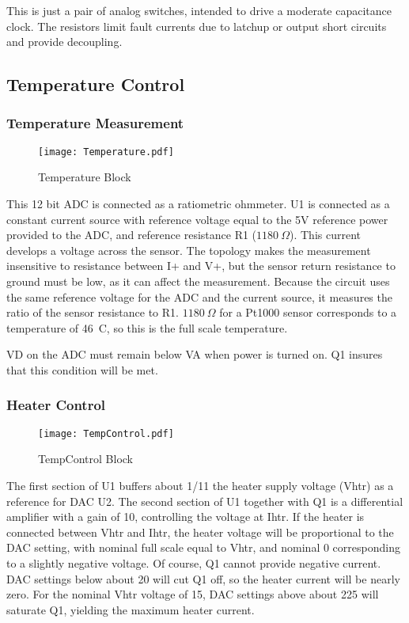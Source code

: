 This is just a pair of analog switches, intended to drive a moderate capacitance clock. The resistors limit fault currents due to latchup or output short circuits and provide decoupling.

\subsection{Temperature Control}

\subsubsection{Temperature Measurement}
   \begin{figure}
   \begin{center}
   \texttt{[image: Temperature.pdf]}
   \end{center}
   \caption{Temperature Block}
   \end{figure}
   
This 12 bit ADC is connected as a ratiometric ohmmeter. U1 is connected as a constant current source with reference voltage equal to the 5V reference power provided to the ADC, and reference resistance R1 ($1180\ \Omega$). This current develops a voltage across the sensor. The topology makes the measurement insensitive to resistance between I+ and V+, but the sensor return resistance to ground must be low, as it can affect the measurement. Because the circuit uses the same reference voltage for the ADC and the current source, it measures the ratio of the sensor resistance to R1. $1180\ \Omega$ for a Pt1000 sensor corresponds to a temperature of 46\ C, so this is the full scale temperature.

VD on the ADC must remain below VA when power is turned on. Q1 insures that this condition will be met.

\subsubsection{Heater Control}
   \begin{figure}
   \begin{center}
   \texttt{[image: TempControl.pdf]}
   \end{center}
   \caption{TempControl Block}
   \end{figure}

The first section of U1 buffers about 1/11 the heater supply voltage (Vhtr) as a reference for DAC U2. The second section of U1 together with Q1 is a differential amplifier with a gain of 10, controlling the voltage at Ihtr.  If the heater is connected between Vhtr and Ihtr, the heater voltage will be proportional to the DAC setting, with nominal full scale equal to Vhtr, and nominal 0 corresponding to a slightly negative voltage. Of course, Q1 cannot provide negative current. DAC settings below about 20 will cut Q1 off, so the heater current will be nearly zero. For the nominal Vhtr voltage of 15, DAC settings above about 225 will saturate Q1, yielding the maximum heater current.

